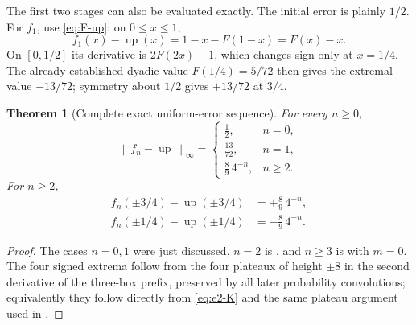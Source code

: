 \documentclass[11pt,oneside]{article}
\newtheorem{theorem}{Theorem}[section]
\theoremstyle{definition}
\theoremstyle{remark}
\newcommand{\Up}{\operatorname{up}}
\newcommand{\norm}[1]{\left\lVert #1\right\rVert}
\begin{document}
The first two stages can also be evaluated exactly.  The initial error is plainly $1/2$.  For
$f_1$, use \eqref{eq:F-up}: on $0\le x\le1$,
\begin{equation}
 f_1(x)-\Up(x)=1-x-F(1-x)=F(x)-x.                          \label{eq:e1-F}
\end{equation}
On $[0,1/2]$ its derivative is $2F(2x)-1$, which changes sign only at $x=1/4$.  The already
established dyadic value $F(1/4)=5/72$ then gives the extremal value $-13/72$; symmetry about
$1/2$ gives $+13/72$ at $3/4$.

\begin{theorem}[Complete exact uniform-error sequence]
\label{thm:complete-error}
For every $n\ge0$,
\begin{equation}
 \boxed{\displaystyle
 \norm{f_n-\Up}_\infty=
 \begin{cases}
  \frac12,&n=0,\\[0.25em]
  \frac{13}{72},&n=1,\\[0.25em]
  \frac89\,4^{-n},&n\ge2.
 \end{cases}}                                              \label{eq:complete-error}
\end{equation}
For $n\ge2$,
\begin{equation}
 \begin{aligned}
 f_n(\pm3/4)-\Up(\pm3/4)&=+\frac89\,4^{-n},\\
 f_n(\pm1/4)-\Up(\pm1/4)&=-\frac89\,4^{-n}.
 \end{aligned}                                             \label{eq:four-extrema}
\end{equation}
\end{theorem}

\begin{proof}
The cases $n=0,1$ were just discussed, $n=2$ is , and $n\ge3$ is
 with $m=0$.  The four signed extrema follow from the four plateaux
of height $\pm8$ in the second derivative of the three-box prefix, preserved by all later
probability convolutions; equivalently they follow directly from \eqref{eq:e2-K} and the same
plateau argument used in .
\end{proof}
\end{document}
